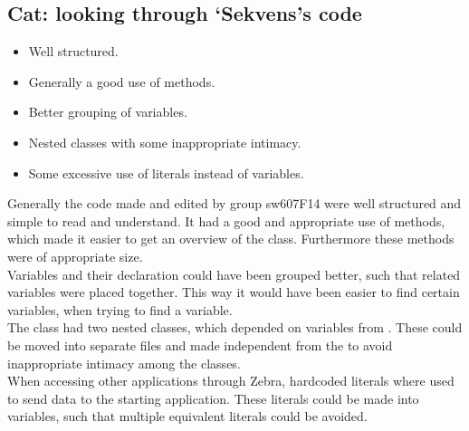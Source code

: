 \subsection{Cat: looking through `Sekvens's code}\label{subsec:collab_sekvenscorrections}
\begin{itemize}
	\item Well structured. 	
	\item Generally a good use of methods.
	\item Better grouping of variables.
	\item Nested classes with some inappropriate intimacy.
	\item Some excessive use of literals instead of variables. 	
\end{itemize}
Generally the code made and edited by group sw607F14 were well structured and simple to read and understand. It had a good and appropriate use of methods, which made it easier to get an overview of the class. Furthermore these methods were of appropriate size.\\
Variables and their declaration could have been grouped better, such that related variables were placed together. This way it would have been easier to find certain variables, when trying to find a variable.\\
The class  had two nested classes, which depended on variables from . These could be moved into separate files and made independent from the  to avoid inappropriate intimacy among the classes.\\
When accessing other applications through Zebra, hardcoded literals where used to send data to the starting application. These literals could be made into variables, such that multiple equivalent literals could be avoided.